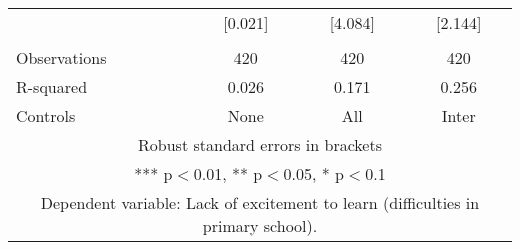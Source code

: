 \begin{tabular}{lccc}
 & [0.021] & [4.084] & [2.144] \\
 &  &  &  \\
Observations & 420 & 420 & 420 \\
R-squared & 0.026 & 0.171 & 0.256 \\
 Controls & None & All & Inter \\ \hline
\multicolumn{4}{c}{ Robust standard errors in brackets} \\
\multicolumn{4}{c}{ *** p$<$0.01, ** p$<$0.05, * p$<$0.1} \\
\multicolumn{4}{c}{ Dependent variable: Lack of excitement to learn (difficulties in primary school).} \\
\end{tabular}
